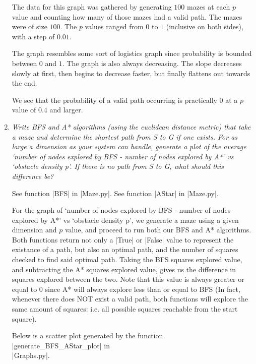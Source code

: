 \documentclass[12pt, twoside]{article}
\begin{document}
\begin{enumerate}
        The data for this graph was gathered by generating $100$ mazes at each $p$ value and counting how many of those mazes had a valid path. The mazes were of size $100$. The $p$ values ranged from $0$ to $1$ (inclusive on both sides), with a step of $0.01$. 

        The graph resembles some sort of logistics graph since probability is bounded between $0$ and $1$. The graph is also always decreasing. The slope decreases slowly at first, then begins to decrease faster, but finally flattens out towards the end. 
        
        We see that the probability of a valid path occurring is practically $0$ at a $p$ value of $0.4$ and larger.

        \vfill

    \item
        \textit{Write BFS and A* algorithms (using the euclidean distance metric) that take a maze and determine  the  shortest  path  from S to G if  one  exists.  For  as  large  a  dimension  as  your  system  can handle, generate a plot of the average ‘number of nodes explored by BFS - number of nodes explored by A*’ vs ‘obstacle density p’.  If there is no path from S to G, what should this difference be?}

        \vspace{4mm}
        See function \cverb|BFS| in \cverb|Maze.py|. See function \cverb|AStar| in \cverb|Maze.py|.

        \vspace{4mm}
        For the graph of `number of nodes explored by BFS - number of nodes explored by A*' vs `obstacle density p', we generate a maze using a given dimension and $p$ value, and proceed to run both our BFS and A* algorithms. Both functions return not only a \cverb|True| or \cverb|False| value to represent the existance of a path, but also an optimal path, and the number of squares checked to find said optimal path. Taking the BFS squares explored value, and subtracting the A* squares explored value, gives us the difference in squares explored between the two. Note that this value is always greater or equal to 0 since A* will always explore less than or equal to BFS (In fact, whenever there does NOT exist a valid path, both functions will explore the same amount of squares: i.e. all possible squares reachable from the start square).  

        Below is a scatter plot generated by the function \cverb|generate_BFS_AStar_plot| in \\ \cverb|Graphs.py|.


\end{enumerate}
\end{document}
